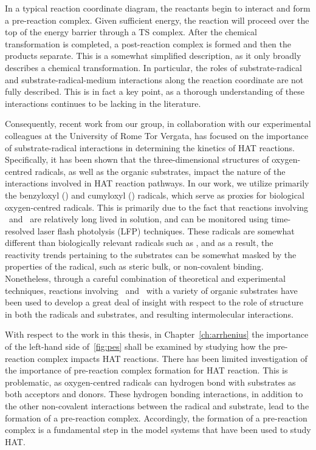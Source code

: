\begin{doublespace}
In a typical reaction coordinate diagram, the reactants begin to interact and
form a pre-reaction complex. Given sufficient energy, the reaction will proceed
over the top of the energy barrier through a TS complex. After the chemical
transformation is completed, a post-reaction complex is formed and then the
products separate. This is a somewhat simplified description, as it only broadly
describes a chemical transformation. In particular, the roles of
substrate-radical and substrate-radical-medium interactions along the reaction
coordinate are not fully described. This is in fact a key point, as a thorough
understanding of these interactions continues to be lacking in the literature.

Consequently, recent work from our group, in collaboration with our experimental
colleagues at the University of Rome Tor Vergata, has focused on the importance
of substrate-radical interactions in determining the kinetics of HAT reactions.
Specifically, it has been shown that the three-dimensional structures of
oxygen-centred radicals, as well as the organic substrates, impact the nature of
the interactions involved in HAT reaction pathways.\cite{Salamone2015Rev} In our
work, we utilize primarily the benzyloxyl (\bno) and cumyloxyl (\cumo) radicals,
which serve as proxies for biological oxygen-centred radicals. This is primarily
due to the fact that reactions involving \bno\ and \cumo\ are relatively long
lived in solution, and can be monitored using time-resolved laser flash
photolysis (LFP) techniques. These radicals are somewhat different than
biologically relevant radicals such as , and as a result, the
reactivity trends pertaining to the substrates can be somewhat masked by the
properties of the radical, such as steric bulk,\cite{Finn2004} or non-covalent
binding.\cite{Salamone2011b} Nonetheless, through a careful combination of
theoretical and experimental techniques, reactions involving \bno\ and \cumo\
with a variety of organic substrates have been used to develop a great deal of
insight with respect to the role of structure in both the radicals and
substrates, and resulting intermolecular interactions.

With respect to the work in this thesis, in Chapter~\ref{ch:arrhenius} the
importance of the left-hand side of~\ref{fig:pes} shall be examined by studying
how the pre-reaction complex impacts HAT reactions. There has been limited
investigation of the importance of pre-reaction complex formation for HAT
reaction.\cite{Kreilick1966} This is problematic, as oxygen-centred radicals can
hydrogen bond with substrates as both acceptors and donors.\cite{Johnson2009a}
These hydrogen bonding interactions, in addition to the other non-covalent
interactions between the radical and substrate, lead to the formation of a
pre-reaction complex. Accordingly, the formation of a pre-reaction complex is a
fundamental step in the model systems that have been used to study HAT.


\end{doublespace}
